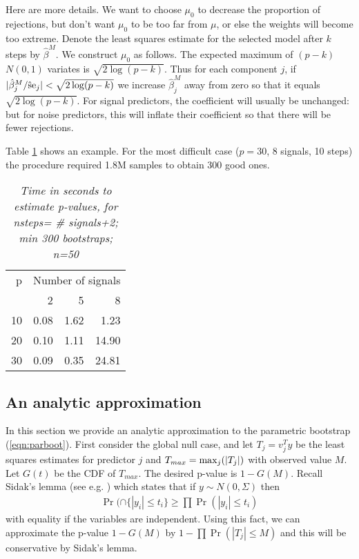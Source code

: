 \documentclass{article}
\begin{document}
Here are more details.
We want to choose $\mu_0$ to decrease the proportion of rejections, but don't want $\mu_0$ to be too far from $\mu$, or else the weights
will become too extreme.
 Denote the least squares estimate for the selected model after $k$ steps by $\hat\beta^M$.
We construct $\mu_0$ as follows.
The expected maximum of $(p-k)$  $N(0,1)$ variates is $\sqrt{2\log(p-k)}$.
Thus for  each component $j$, if $|\hat\beta_j^M/{\rm \hat se}_j|< \sqrt{2\log(p-k)}$ we increase $\hat\beta_j^M$ away from zero 
so that it equals $\sqrt{2\log(p-k)}$. For signal predictors, the coefficient will usually be unchanged: but for noise predictors, this will inflate their
coefficient so that there will be fewer rejections.




Table \ref{tab:tab1} shows an example. For the most difficult  case ($p=30$,  8 signals, 10 steps) the procedure required  1.8M samples to obtain 300 good ones.

\begin{table}[ht]
\centering
\begin{tabular}{r|rrr}
  \hline
  p&\multicolumn{3}{c}{Number of signals}\\
 & 2 & 5 & 8 \\ 
  \hline
  10 & 0.08 & 1.62 & 1.23 \\ 
  20 & 0.10 & 1.11 & 14.90\\ 
  30& 0.09 & 0.35 & 24.81 \\ 
   \hline
\end{tabular}
\label{tab:tab1}
\caption{\em Time in seconds to estimate p-values, for nsteps= \# signals+2; min 300 bootstraps; n=50}
\end{table}


\subsection{An analytic approximation}
\label{sec:analytic}
In this section we provide an analytic approximation to the parametric bootstrap (\ref{eqn:parboot}).
First consider the global null case, and let $T_j=v_j^Ty$ be the least squares estimates for predictor $j$  and $T_{max}={\rm max}_j(|T_j|)$ with observed value $M$.
Let $G(t)$ be the CDF of $T_{max}$. The desired p-value is $1-G(M)$.
Recall  Sidak's  lemma (see e.g. \citet{tong1990}) which states that if $y \sim N(0,\Sigma)$ then
\begin{eqnarray}
\Pr(\cap\{ |y_i| \leq t_i\} \geq \prod \Pr(|y_i| \leq t_i)
\end{eqnarray}
with equality if the variables are independent. Using this fact, we can approximate the p-value  $1-G(M)$ by 
$1-\prod \Pr(|T_j| \leq M)$ and this will be conservative by Sidak's lemma.
\end{document}
